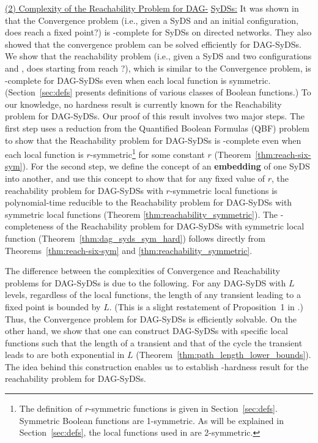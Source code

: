 \noindent
\underline{(2) Complexity of the Reachability Problem for DAG-}\newline
\underline{SyDSs:} 
It was shown in
\cite{Chistikov-etal-2020} that the Convergence problem
(i.e., given a SyDS \cals{} and an initial configuration,
does \cals{} reach a fixed point?) is \cpsp-complete
for SyDSs on directed networks.
They also showed that the convergence problem can be solved efficiently
for DAG-SyDSs.
We show that the reachability problem
(i.e., given a SyDS \cals{} and two configurations \calc{} and \cald{},
does \cals{} starting from \calc{} reach \cald{}?),
which is similar to the Convergence problem, 
is \cpsp-complete for DAG-SyDSs even
when each local function is symmetric.
(Section~\ref{sec:defs} presents definitions of various classes
of Boolean functions.)
To our knowledge, no hardness result is currently known for
the Reachability problem for DAG-SyDSs.
Our proof of this result involves two major steps.
The first step uses a reduction from the Quantified Boolean Formulas
(QBF) problem \cite{GJ-1979} to show that the Reachability problem for DAG-SyDSs is
\cpsp-complete even when each local function is 
$r$-symmetric\footnote{The definition of $r$-symmetric functions is given in
Section~\ref{sec:defs}. Symmetric Boolean functions
are 1-symmetric. As will be explained in Section~\ref{sec:defs},
the local functions used in \cite{Chistikov-etal-2020} are
2-symmetric.}
for some constant $r$ (Theorem~\ref{thm:reach-six-sym}).
For the second step,
we define the concept of an \textbf{embedding} of one SyDS into another,
and use this concept to show that
for any fixed value of $r$, 
the reachability problem for DAG-SyDSs with $r$-symmetric local functions 
is polynomial-time reducible to the Reachability problem for DAG-SyDSs with
symmetric  local functions (Theorem \ref{thm:reachability_symmetric}).
The \cpsp-completeness of the Reachability problem for DAG-SyDSs with 
symmetric local function (Theorem~\ref{thm:dag_syds_sym_hard})
follows directly from Theorems~\ref{thm:reach-six-sym} and 
\ref{thm:reachability_symmetric}.

\smallskip
The difference between the complexities of Convergence
and Reachability problems for DAG-SyDSs is due to the following.
For any DAG-SyDS with $L$ levels, regardless of the local functions,
the length of any transient leading to a fixed point is bounded
by $L$. (This is a slight restatement of Proposition~1 
in \cite{Chistikov-etal-2020}.)
Thus, the Convergence problem for DAG-SyDSs is efficiently solvable.
On the other hand, we show that one can construct DAG-SyDSs with specific local
functions such that the length of a transient and that of 
the cycle the transient leads to are both exponential in $L$
(Theorem~\ref{thm:path_length_lower_bounds}).
The idea behind this construction enables us 
to establish \cpsp-hardness result for
the reachability problem for DAG-SyDSs.

